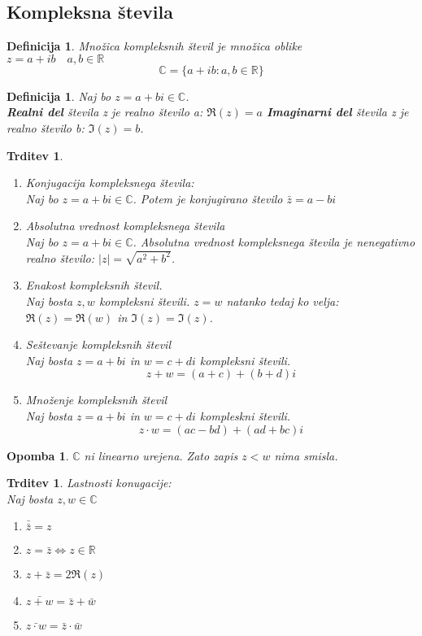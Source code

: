 \documentclass[11pt]{article}
\newtheorem{Trditev}[Izrek]{{\sc Trditev}}
\newtheorem{Definicija}[Izrek]{{\sc Definicija}}
\newtheorem{Opomba}[Izrek]{{\sc Opomba}}
\begin{document}
\subsection{Kompleksna števila}
\begin{Definicija}
	Množica kompleksnih števil je množica oblike \\ $z = a + ib \quad a,b\in \mathbb{R}$
	$$\mathbb{C} = \{a + ib: a,b\in \mathbb{R}\}$$
\end{Definicija}
\begin{Definicija}
	Naj bo $ z = a +bi \in \mathbb{C}$. 
	\\
	\textbf{Realni del} števila z je realno število a: $\Re(z) = a$
	\textbf{ Imaginarni del} števila z je realno število b: $\Im(z) = b$.
\end{Definicija}
\begin{Trditev}
	\begin{enumerate}
		\item
		Konjugacija kompleksnega števila:
		\\ 
		Naj bo $ z = a +bi \in \mathbb{C}$. Potem je konjugirano število $\bar{z} = a - bi$
		\item
		Absolutna vrednost kompleksnega števila
		\\
		Naj bo $z = a+bi \in \mathbb{C}$. Absolutna vrednost kompleksnega števila je nenegativno realno število: $|z| = \sqrt{a^2 + b^2}$.
		\item
		Enakost kompleksnih števil.
		\\
		Naj bosta $z, w$ kompleksni števili. $z =w$ natanko tedaj ko velja: $\Re(z) = \Re(w)$ in $\Im(z) =\Im(z)$.
		\item
		Seštevanje kompleksnih števil
		\\
		Naj bosta $z = a+ bi$ in $w = c+ di$ kompleksni števili. $$z + w = (a+c) + (b+d)i$$
		\item
		Množenje kompleksnih števil
		\\
		Naj bosta $z = a+bi$ in $ w = c + di$ kompleskni števili.
		$$ z\cdot w = (ac - bd) + (ad + bc)i$$
	\end{enumerate}
\end{Trditev}
\begin{Opomba}
	$\mathbb{C}$ ni linearno urejena. Zato zapis $z < w$ nima smisla.
\end{Opomba}
\begin{Trditev}
	Lastnosti konugacije:
	\\
	Naj bosta $z,w \in \mathbb{C}$
	\begin{enumerate}
		\item
		$\bar{\bar{z}} = z$
		\item
		$ z =\bar{z} \iff z \in \mathbb{R}$
		\item
		$ z + \bar{z} = 2\Re(z)$
		\item
		$\bar{z+w} = \bar{z} + \bar{w}$
		\item
		$\bar{z\cdot w} = \bar{z}\cdot \bar{w}$
	\end{enumerate}
\end{Trditev}
\end{document}
